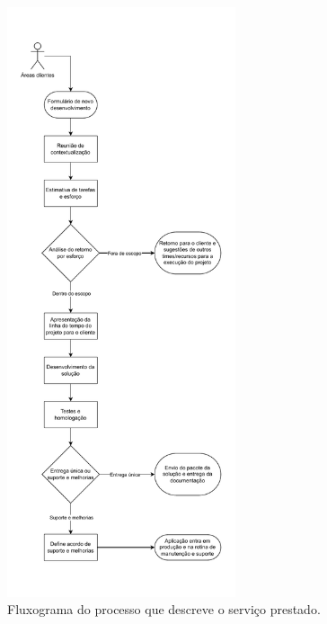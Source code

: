 	\begin{figure}[H]
		\centering
		\includegraphics[width=0.6\textwidth]{./figuras/processFlow.pdf}
		\caption{Fluxograma do processo que descreve o serviço prestado.}
		\label{fig:metodologia:processFlow}
	\end{figure}
	

